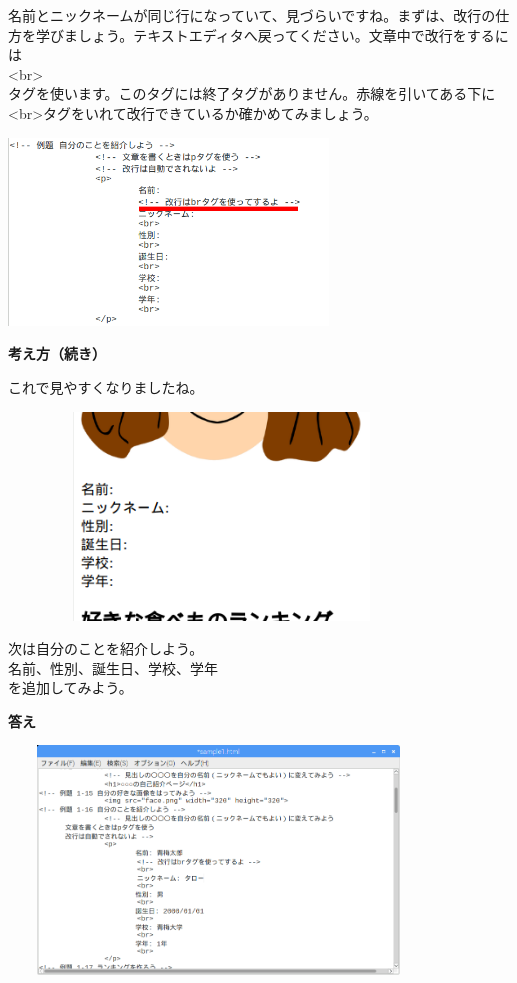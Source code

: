 \documentclass[a4paper,12pt]{jarticle}
\begin{document}
\bigskip

\flushleft
名前とニックネームが同じ行になっていて、見づらいですね。まずは、改行の仕方を学びましょう。テキストエディタへ戻ってください。文章中で改行をするには\\
{\textless}br{\textgreater} \ \ \ \ \ \\
タグを使います。このタグには終了タグがありません。赤線を引いてある下に{\textless}br{\textgreater}タグをいれて改行できているか確かめてみましょう。


\centering
\includegraphics[width=8.504cm,height=4.983cm]{textbook-img174.png}

\clearpage
\flushleft

\textbf{考え方（続き）}


これで見やすくなりましたね。

\bigskip


\includegraphics[width=11.28cm,height=5.526cm]{textbook-img176.png}

\bigskip

次は自分のことを紹介しよう。\\
名前、性別、誕生日、学校、学年\\
を追加してみよう。



\bigskip

\bigskip


\textbf{答え}


\bigskip

\includegraphics[width=11.151cm,height=6.066cm]{textbook-img177.png}
\end{document}

